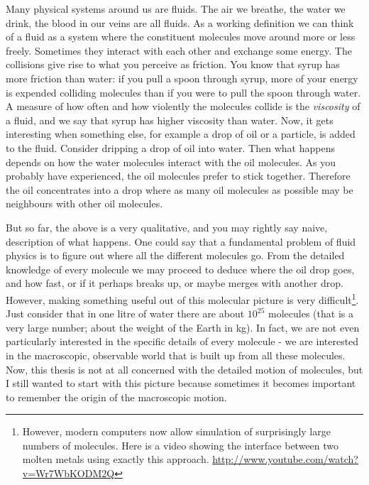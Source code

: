 \documentclass[thesis.tex]{subfiles}
\begin{document}
Many physical systems around us are fluids. The air we breathe, the water we drink, the blood in our veins are all fluids. As a working definition we can think of a fluid as a system where the constituent molecules move around more or less freely. Sometimes they interact with each other and exchange some energy. The collisions give rise to what you perceive as friction. You know that syrup has more friction than water: if you pull a spoon through syrup, more of your energy is expended colliding molecules than if you were to pull the spoon through water. A measure of how often and how violently the molecules collide is the \emph{viscosity} of a fluid, and we say that syrup has higher viscosity than water. Now, it gets interesting when something else, for example a drop of oil or a particle, is added to the fluid. Consider dripping a drop of oil into water. Then what happens depends on how the water molecules interact with the oil molecules. As you probably have experienced, the oil molecules prefer to stick together. Therefore the oil concentrates into a drop where as many oil molecules as possible may be neighbours with other oil molecules.

But so far, the above is a very qualitative, and you may rightly say naive, description of what happens. One could say that a fundamental problem of fluid physics is to figure out where all the different molecules go. From the detailed knowledge of every molecule we may proceed to deduce where the oil drop goes, and how fast, or if it perhaps breaks up, or maybe merges with another drop. However, making something useful out of this molecular picture is very difficult\footnote{
However, modern computers now allow simulation of surprisingly large numbers of molecules. Here is a video showing the interface between two molten metals using exactly this approach. \url{http://www.youtube.com/watch?v=Wr7WbKODM2Q}
}.
Just consider that in one litre of water there are about $10^{25}$ molecules (that is a very large number; about the weight of the Earth in kg). In fact, we are not even particularly interested in the specific details of every molecule - we are interested in the macroscopic, observable world that is built up from all these molecules. Now, this thesis is not at all concerned with the detailed motion of molecules, but I still wanted to start with this picture because sometimes it becomes important to remember the origin of the macroscopic motion.
\end{document}
